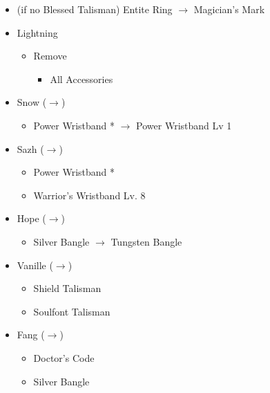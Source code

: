 \begin{paracol}{2}
\begin{menu}
\begin{itemize}
\begin{itemize}
\begin{itemize}
					      \item (if no Blessed Talisman) Entite Ring $\rightarrow$ Magician's Mark
				      \end{itemize}
			\end{itemize}
		\end{itemize}
	\end{menu}
	\switchcolumn
	\begin{menu}
		\begin{itemize}
			\equip
			\begin{itemize}
				\item Lightning
				      \begin{itemize}
					      \item Remove
					            \begin{itemize}
						            \item All Accessories
					            \end{itemize}
				      \end{itemize}
				\item Snow ($\rightarrow$)
				      \begin{itemize}
					      \item Power Wristband * $\rightarrow$ Power Wristband Lv 1
				      \end{itemize}
				\item Sazh ($\rightarrow$)
				      \begin{itemize}
					      \item Power Wristband *
					      \item Warrior's Wristband Lv. 8
				      \end{itemize}
				\item Hope ($\rightarrow$)
				      \begin{itemize}
					      \item Silver Bangle $\rightarrow$ Tungsten Bangle
				      \end{itemize}
				\item Vanille ($\rightarrow$)
				      \begin{itemize}
					      \item Shield Talisman
					      \item Soulfont Talisman
				      \end{itemize}
				\item Fang ($\rightarrow$)
				      \begin{itemize}
					      \item Doctor's Code
					      \item Silver Bangle

\end{itemize}
\end{itemize}
\end{itemize}
\end{menu}
\end{paracol}
